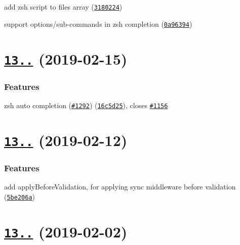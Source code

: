 \begin{DoxyItemize}
\item add zsh script to files array (\href{https://github.com/yargs/yargs/commit/3180224}{\tt 3180224})
\item support options/sub-\/commands in zsh completion (\href{https://github.com/yargs/yargs/commit/0a96394}{\tt 0a96394})
\end{DoxyItemize}

\section*{\href{https://github.com/yargs/yargs/compare/v13.1.0...v13.2.0}{\tt 13..} (2019-\/02-\/15)}

\subsubsection*{Features}


\begin{DoxyItemize}
\item zsh auto completion (\href{https://github.com/yargs/yargs/issues/1292}{\tt \#1292}) (\href{https://github.com/yargs/yargs/commit/16c5d25}{\tt 16c5d25}), closes \href{https://github.com/yargs/yargs/issues/1156}{\tt \#1156}
\end{DoxyItemize}

\label{_13.1.0}%
 \section*{\href{https://github.com/yargs/yargs/compare/v13.0.0...v13.1.0}{\tt 13..} (2019-\/02-\/12)}

\subsubsection*{Features}


\begin{DoxyItemize}
\item add apply\+Before\+Validation, for applying sync middleware before validation (\href{https://github.com/yargs/yargs/commit/5be206a}{\tt 5be206a})
\end{DoxyItemize}

\label{_13.0.0}%
 \section*{\href{https://github.com/yargs/yargs/compare/v12.0.5...v13.0.0}{\tt 13..} (2019-\/02-\/02)}

